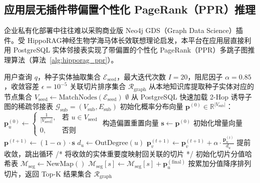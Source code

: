 \subsection{应用层无插件带偏置个性化 PageRank（PPR）推理}
企业私有化部署中往往难以采购商业版 Neo4j GDS（Graph Data Science）插件。受 HippoRAG\cite{Gutierrez2024HippoRAG}神经生物学海马体长效联想理论启发，本平台在应用层直接利用 PostgreSQL 实体邻接表实现了带偏置的个性化 PageRank（PPR）多跳子图推理算法（算法~\ref{alg:hipporag_ppr}）。

\begin{algorithm}[htbp]
    \caption{应用层无插件带偏置个性化 PageRank (PPR) 子图推理算法}
    \label{alg:hipporag_ppr}
    \begin{algorithmic}[1]
        \Require 用户查询 $q$，种子实体抽取集合 $\mathcal{E}_{\text{seed}}$，最大迭代次数 $I=20$，阻尼因子 $\alpha=0.85$，收敛容差 $\epsilon=10^{-5}$
        \Ensure 关联切片排序集合 $\mathcal{R}_{\text{graph}}$
        \State 从本地知识库提取种子实体对应的节点集合 $V_{\text{seed}} \leftarrow \text{MatchNodes}(\mathcal{E}_{\text{seed}})$
        \State \Return $\emptyset$
        \EndIf
        \State 从 PostgreSQL 快速加载 2-Hop 诱导子图的稀疏邻接表 $\mathcal{G}_{\text{sub}} = (V_{\text{sub}}, E_{\text{sub}})$
        \State 初始化概率分布向量 $\mathbf{p}^{(0)} \in \mathbb{R}^{|V_{\text{sub}}|}$：
        \State $\mathbf{p}_u^{(0)} \leftarrow \begin{cases} \frac{1}{|V_{\text{seed}}|}, & \text{若 } u \in V_{\text{seed}} \\ 0, & \text{否则} \end{cases}$
        \EndFor
        \State 构造偏置重置向量 $\mathbf{s} \leftarrow \mathbf{p}^{(0)}$
        \State 初始化增量向量 $\mathbf{p}^{(t+1)} \leftarrow (1 - \alpha) \cdot \mathbf{s}$
        \State $d_u \leftarrow \text{OutDegree}(u)$
        \State $\mathbf{p}_v^{(t+1)} \leftarrow \mathbf{p}_v^{(t+1)} + \alpha \cdot \frac{\mathbf{p}_u^{(t)}}{d_u}$
        \EndIf
        \EndFor
        \State 提前收敛，跳出循环
        \EndIf
        \EndFor
        \State /* 将收敛的实体重要度映射回关联的切片 */
        \State 初始化切片分值哈希表 $\mathcal{M}_{\text{seg}} \leftarrow \text{NewMap}()$
        \State $\mathcal{M}_{\text{seg}}[s] \leftarrow \mathcal{M}_{\text{seg}}[s] + \mathbf{p}_u^{(\text{final})}$
        \EndFor
        \EndFor
        \State 按累加分值降序排列切片，返回 Top-K 结果集合 $\mathcal{R}_{\text{graph}}$
    \end{algorithmic}
\end{algorithm}

